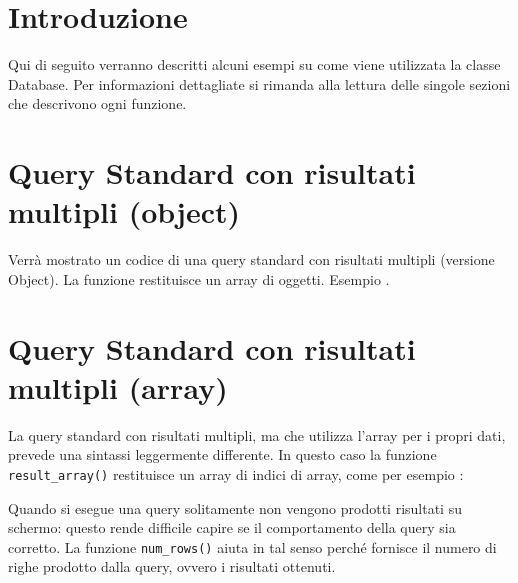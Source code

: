 \section*{Introduzione}
Qui di seguito verranno descritti alcuni esempi su come viene utilizzata la classe Database. Per informazioni dettagliate si rimanda alla lettura delle singole sezioni che descrivono ogni funzione.

\section*{Query Standard con risultati multipli (object)}
Verrà mostrato un codice di una query standard con risultati multipli (versione Object). La funzione  restituisce un array di oggetti. Esempio .


\section*{Query Standard con risultati multipli (array)}
La query standard con risultati multipli, ma che utilizza l'array per i propri dati, prevede una sintassi leggermente differente. In questo caso la funzione \verb|result_array()| restituisce un array di indici di array, come per esempio :


Quando si esegue una query solitamente non vengono prodotti risultati su schermo: questo rende difficile capire se il comportamento della query sia corretto. La funzione \verb|num_rows()| aiuta in tal senso perché fornisce il numero di righe prodotto dalla query, ovvero i risultati ottenuti.


